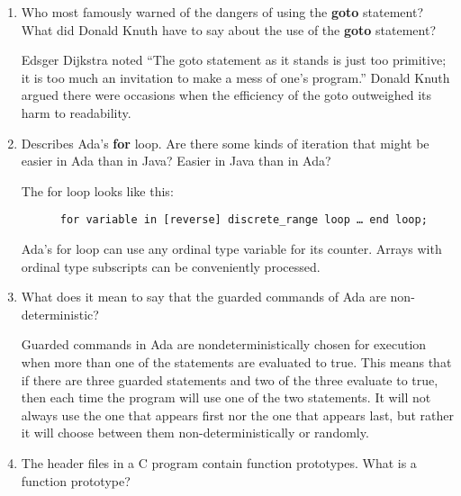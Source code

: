 \begin{enumerate}
\begin{answer}
  \end{answer}

  \item Who most famously warned of the dangers of using the
    \textbf{goto} statement? What did Donald Knuth have to
    say about the use of the \textbf{goto} statement?

  \begin{answer}

    Edsger Dijkstra noted “The goto statement as it stands is
    just too primitive; it is too much an invitation to make a
    mess of one’s program.” Donald Knuth argued there were
    occasions when the efficiency of the goto outweighed its
    harm to readability.

  \end{answer}

  \item Describes Ada's \textbf{for} loop. Are there some
    kinds of iteration that might be easier in Ada than
    in Java? Easier in Java than in Ada?

  \begin{answer}

    The for loop looks like this:
    \begin{lstlisting}
      for variable in [reverse] discrete_range loop … end loop;
    \end{lstlisting}
    Ada’s for loop can use any ordinal type variable for
    its counter. Arrays with ordinal type subscripts can be
    conveniently processed.

  \end{answer}

  \item What does it mean to say that the guarded commands
    of Ada are non-deterministic?

  \begin{answer}

    Guarded commands in Ada are nondeterministically chosen
    for execution when more than one of the statements are
    evaluated to true. This means that if there are three
    guarded statements and two of the three evaluate to true,
    then each time the program will use one of the two
    statements. It will not always use the one that appears
    first nor the one that appears last, but rather it will
    choose between them non-deterministically or randomly.

  \end{answer}

  \item The header files in a C program contain function
    prototypes. What is a function prototype?


\end{enumerate}
